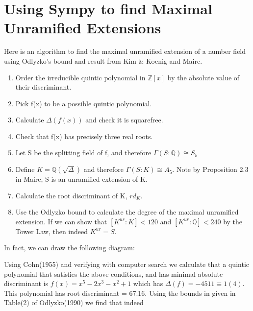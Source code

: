 \documentclass[preprint,12pt,reqno]{elsarticle}
\begin{document}
\section{Using Sympy to find Maximal Unramified Extensions}
Here is an algorithm to find the maximal unramified extension of a number field using Odlyzko's bound and result from Kim \& Koenig and Maire.
\begin{enumerate}
  \item  Order the irreducible quintic polynomial in $\mathbb{Z}[x]$ by the absolute value of their discriminant. 
  \item Pick f(x) to be a possible quintic polynomial.
  \item Calculate $\Delta(f(x))$ and check it is squarefree.
  \item Check that f(x) has precisely three real roots. 
  \item Let S be the splitting field of f, and therefore $\Gamma(S:\mathbb{Q})\cong S_5$
  \item Define $K=\mathbb{Q}(\sqrt{\Delta})$ and therefore $\Gamma(S:K)\cong A_5$. Note by Proposition 2.3 in Maire, S is an unramified extension of K. 
  \item Calculate the root discriminant of K, $rd_K$.
  \item Use the Odlyzko bound to calculate the degree of the maximal unramified extension. If we can show that $[K^{ur}:K]<120$ and $[K^{ur}:\mathbb{Q}]<240$ by the Tower Law, then indeed $K^{ur} = S$.
\end{enumerate}
\par
In fact, we can draw the following diagram: 
\par
\begin{center}
\end{center}
Using Cohn(1955) and verifying with computer search we calculate that a quintic polynomial that satisfies the above conditions, and has minimal absolute discriminant is $f(x) = x^5-2x^3-x^2+1$ which has $\Delta(f) = -4511\equiv1(4)$.
This polynomial has root discriminant = 67.16.
Using the bounds in given in Table(2) of Odlyzko(1990) we find that indeed
\end{document}
